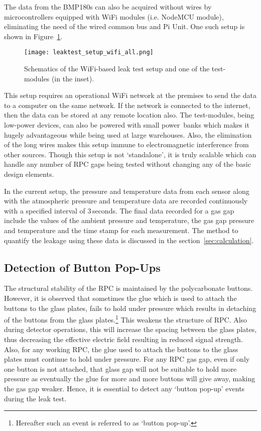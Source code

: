 The data from the BMP180s can also be acquired without wires by
microcontrollers equipped with WiFi modules (i.e. NodeMCU
module\cite{nodemcu2015}), eliminating the need of the wired common bus and
Pi Unit. One such setup is shown in Figure~\ref{fig:leakwifi}. 
\begin{figure}
  \centering
  \texttt{[image: leaktest\_setup\_wifi\_all.png]}
  \caption{Schematics of the WiFi-based leak test setup and one of the
    test-modules (in the inset).}
  \label{fig:leakwifi}
\end{figure}
This setup requires an operational WiFi network at the premises to send the
data to a computer on the same network. If the network is connected to the
internet, then the data can be stored at any remote location also. The
test-modules, being low-power devices, can also be powered with small
power~banks which makes it hugely advantageous while being used at large
warehouses. Also, the elimination of the long wires makes this setup immune
to electromagnetic interference from other sources. Though this setup is not
`standalone', it is truly scalable which can handle any number of RPC gaps
being tested without changing any of the basic design elements.

In the current setup, the pressure and temperature data from each
sensor along with the atmospheric pressure and temperature data are
recorded continuously with a specified interval of $3$\,seconds.
The final data recorded for a gas gap include the values of the
ambient pressure and temperature, the gas gap pressure and temperature
and the time stamp for each measurement. %
The method to quantify the leakage using these data is discussed in the
section~\ref{sec:calculation}.

\subsection{Detection of Button Pop-Ups}\label{sec:button}
The structural stability of the RPC is maintained by the polycarbonate
buttons. However, it is observed that sometimes the glue which is used
to attach the buttons to the glass plates, fails to hold under
pressure which results in detaching of the buttons from the glass
plates.\footnote{Hereafter such an event is referred to as
  `button pop-up'.}
This weakens the structure of RPC. Also during detector operations,
this will increase the spacing between the glass plates, thus
decreasing the effective electric field resulting in reduced signal
strength. Also, for any working RPC, the glue used to attach the
buttons to the glass plates must continue to hold under pressure.
For any RPC gas gap, even if only one button is not attached, that
glass gap will not be suitable to hold more pressure as eventually the
glue for more and more buttons will give away, making the gas gap
weaker. Hence, it is essential to detect any `button pop-up' events
during the leak test.

